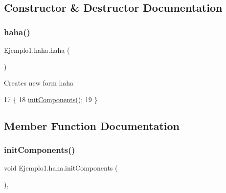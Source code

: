 \subsection{Constructor \& Destructor Documentation}
\mbox{\label{class_ejemplo1_1_1haha_a9cbbbf05676d8f04f61af8a8f380fb49}} 
\subsubsection{\texorpdfstring{haha()}{haha()}}
{\footnotesize\ttfamily Ejemplo1.\+haha.\+haha (\begin{DoxyParamCaption}{ }\end{DoxyParamCaption})\hspace{0.3cm}{\ttfamily [inline]}}

Creates new form haha 
\begin{DoxyCode}
17                   \{
18         \mbox{\hyperlink{class_ejemplo1_1_1haha_a816282daee68f4403ab51247af66a66b}{initComponents}}();
19     \}
\end{DoxyCode}


\subsection{Member Function Documentation}
\mbox{\label{class_ejemplo1_1_1haha_a816282daee68f4403ab51247af66a66b}} 
\subsubsection{\texorpdfstring{init\+Components()}{initComponents()}}
{\footnotesize\ttfamily void Ejemplo1.\+haha.\+init\+Components (\begin{DoxyParamCaption}{ }\end{DoxyParamCaption})\hspace{0.3cm}{\ttfamily [inline]}, {\ttfamily [private]}}

